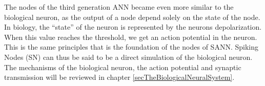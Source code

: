 The nodes of the third generation ANN became even more similar to the biological neuron, as the output of a node depend solely on the state of the node.
In biology, the ``state'' of the neuron is represented by the neurons depolarization.
When this value reaches the threshold, we get an action potential in the neuron.
This is the same principles that is the foundation of the nodes of SANN. 
Spiking Nodes (SN) can thus be said to be a direct simulation of the biological neuron.
The mechanisms of the biological neuron, the action potential and synaptic transmission will be reviewed in chapter \ref{secTheBiologicalNeuralSystem}.











